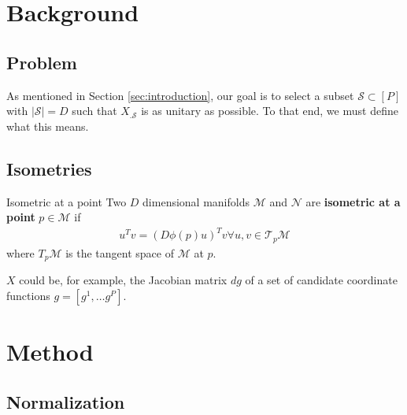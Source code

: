\documentclass[a4paper,11pt]{article}
\begin{document}
\section{Background}

\subsection{Problem}

As mentioned in Section \ref{sec:introduction}, our goal is to select a subset $\mathcal S \subset [P]$ with $|\mathcal S| = D$ such that $X_{. \mathcal S}$ is as unitary as possible.
To that end, we must define what this means.

\subsection{Isometries}

\begin{definition}{Isometric at a point}
Two $D$ dimensional manifolds $\mathcal M$ and $\mathcal N$ are \textbf{isometric at a point} $p \in \mathcal M$ if
\begin{align}
u^T v = (D \phi (p) u)^T v \forall u,v \in \mathcal T_p \mathcal M
\end{align}
where $T_p \mathcal M$ is the tangent space of $\mathcal M$ at $p$.
\end{definition}

$X$ could be, for example, the Jacobian matrix $d g$ of a set of candidate coordinate functions $g = [g^1, \dotsc g^P]$.


\section{Method}


\subsection{Normalization}
\end{document}

